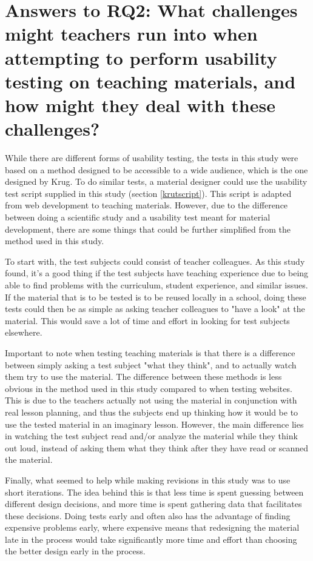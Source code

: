 \section{Answers to RQ2: What challenges might teachers run into when attempting to perform usability testing on teaching materials, and how might they deal with these challenges?} 
\vspace{-0.2cm}
While there are different forms of usability testing, the tests in this study were based on a method designed to be accessible to a wide audience, which is the one designed by Krug. To do similar tests, a material designer could use the usability test script supplied in this study (section \ref{krutscript}). This script is adapted from web development to teaching materials. However, due to the difference between doing a scientific study and a usability test meant for material development, there are some things that could be further simplified from the method used in this study.

To start with, the test subjects could consist of teacher colleagues. As this study found, it's a good thing if the test subjects have teaching experience due to being able to find problems with the curriculum, student experience, and similar issues. If the material that is to be tested is to be reused locally in a school, doing these tests could then be as simple as asking teacher colleagues to "have a look" at the material. This would save a lot of time and effort in looking for test subjects elsewhere.

Important to note when testing teaching materials is that there is a difference between simply asking a test subject "what they think", and to actually watch them try to use the material. The difference between these methods is less obvious in the method used in this study compared to when testing websites. This is due to the teachers actually not using the material in conjunction with real lesson planning, and thus the subjects end up thinking how it would be to use the tested material in an imaginary lesson. However, the main difference lies in watching the test subject read and/or analyze the material while they think out loud, instead of asking them what they think after they have read or scanned the material.

Finally, what seemed to help while making revisions in this study was to use short iterations. The idea behind this is that less time is spent guessing between different design decisions, and more time is spent gathering data that facilitates these decisions. Doing tests early and often also has the advantage of finding expensive problems early, where expensive means that redesigning the material late in the process would take significantly more time and effort than choosing the better design early in the process.

